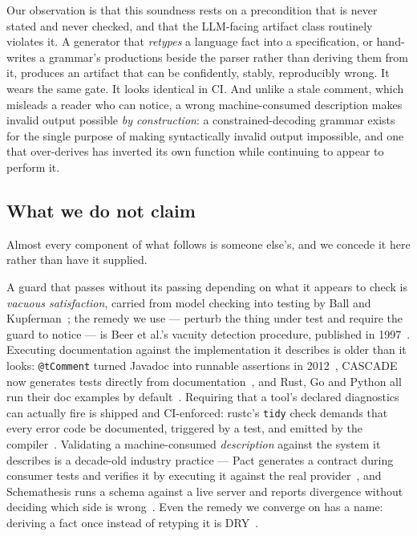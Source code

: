 \documentclass[10pt,journal,compsoc]{IEEEtran}
\begin{document}
Our observation is that this soundness rests on a precondition that is never stated
and never checked, and that the LLM-facing artifact class routinely violates it. A
generator that \emph{retypes} a language fact into a specification, or hand-writes a
grammar's productions beside the parser rather than deriving them from it, produces an
artifact that can be confidently, stably, reproducibly wrong. It wears the same gate.
It looks identical in CI. And unlike a stale comment, which misleads a reader who can
notice, a wrong machine-consumed description makes invalid output possible \emph{by
construction}: a constrained-decoding grammar exists for the single purpose of making
syntactically invalid output impossible, and one that over-derives has inverted its own
function while continuing to appear to perform it.

\subsection{What we do not claim}\label{sec:concede}

Almost every component of what follows is someone else's, and we concede it here
rather than have it supplied.

A guard that passes without its passing depending on what it appears to check is
\emph{vacuous satisfaction}, carried from model checking into testing by Ball and
Kupferman~\cite{ball2008vacuitytesting}; the remedy we use --- perturb the thing under
test and require the guard to notice --- is Beer et al.'s vacuity detection procedure,
published in 1997~\cite{beer1997vacuity}. Executing documentation against the
implementation it describes is older than it looks: \texttt{@tComment} turned Javadoc
into runnable assertions in 2012~\cite{tan2012tcomment}, CASCADE now generates tests
directly from documentation~\cite{kiecker2026cascade}, and Rust, Go and Python all run
their doc examples by default~\cite{rust_doctests,go_testable_examples,python_doctest}.
Requiring that a tool's declared diagnostics can actually fire is shipped and
CI-enforced: rustc's \texttt{tidy} check demands that every error code be documented,
triggered by a test, and emitted by the compiler~\cite{rustc_tidy_errorcodes}.
Validating a machine-consumed \emph{description} against the system it describes is a
decade-old industry practice --- Pact generates a contract during consumer tests and
verifies it by executing it against the real provider~\cite{pact_contract_testing}, and
Schemathesis runs a schema against a live server and reports divergence without
deciding which side is wrong~\cite{schemathesis}. Even the remedy we converge on has a
name: deriving a fact once instead of retyping it is DRY~\cite{hunt1999pragmatic}.
\end{document}
